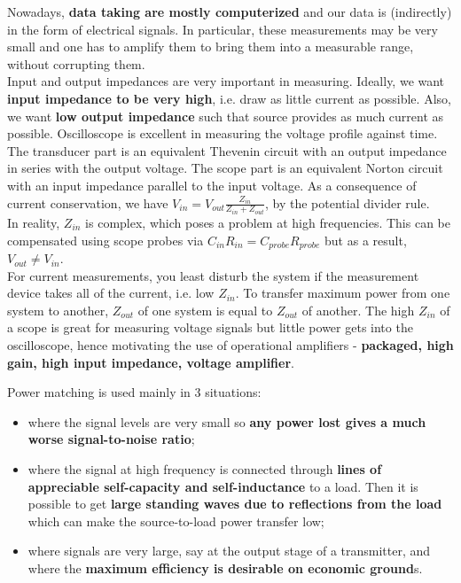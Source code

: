 \documentclass[a4paper]{article}
\begin{document}
\begin{Note}
Nowadays, \textbf{data taking are mostly computerized} and our data is (indirectly) in the form of electrical signals. In particular, these measurements may be very small and one has to amplify them to bring them into a measurable range, without corrupting them.\\[5pt]
Input and output impedances are very important in measuring. Ideally, we want \textbf{input impedance to be very high}, i.e. draw as little current as possible. Also, we want \textbf{low output impedance} such that source provides as much current as possible. Oscilloscope is excellent in measuring the voltage profile against time. The transducer part is an equivalent Thevenin circuit with an output impedance in series with the output voltage. The scope part is an equivalent Norton circuit with an input impedance parallel to the input voltage. As a consequence of current conservation, we have $V_{in}=V_{out}\frac{Z_{in}}{Z_{in}+Z_{out}}$, by the potential divider rule.\\[5pt]
In reality, $Z_{in}$ is complex, which poses a problem at high frequencies. This can be compensated using scope probes via $C_{in}R_{in}=C_{probe}R_{probe}$ but as a result, $V_{out}\neq V_{in}$.\\[5pt]
For current measurements, you least disturb the system if the measurement device takes all of the current, i.e. low $Z_{in}$. To transfer maximum power from one system to another, $Z_{out}$ of one system is equal to $Z_{out}$ of another. The high $Z_{in}$ of a scope is great for measuring voltage signals but little power gets into the oscilloscope, hence motivating the use of operational amplifiers - \textbf{packaged, high gain, high input impedance, voltage amplifier}.
\end{Note}
\begin{Note}
Power matching is used mainly in 3 situations:
\begin{itemize}
    \item where the signal levels are very small so \textbf{any power lost gives a much worse signal-to-noise ratio};
    \item where the signal at high frequency is connected through \textbf{lines of appreciable self-capacity and self-inductance} to a load. Then it is possible to get \textbf{large standing waves due to reflections from the load} which can make the source-to-load power transfer low;
    \item where signals are very large, say at the output stage of a transmitter, and where the \textbf{maximum efficiency is desirable on economic ground}s.
\end{itemize}
\end{Note}
\end{document}
